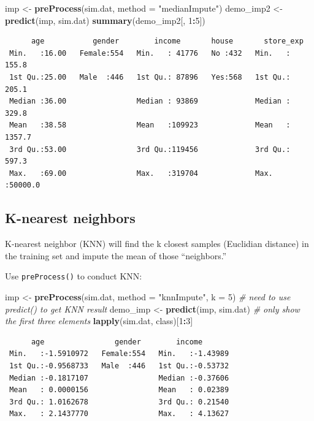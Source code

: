 \documentclass[12pt,]{krantz}
\makeatletter
\newenvironment{Shaded}{\begin{snugshade}}{\end{snugshade}}
\newcommand{\CommentTok}[1]{\textcolor[rgb]{0.37,0.37,0.37}{\textit{#1}}}
\newcommand{\DataTypeTok}[1]{\textcolor[rgb]{0.27,0.27,0.27}{#1}}
\newcommand{\DecValTok}[1]{\textcolor[rgb]{0.06,0.06,0.06}{#1}}
\newcommand{\KeywordTok}[1]{\textcolor[rgb]{0.27,0.27,0.27}{\textbf{#1}}}
\newcommand{\NormalTok}[1]{#1}
\newcommand{\OperatorTok}[1]{\textcolor[rgb]{0.43,0.43,0.43}{\textbf{#1}}}
\newcommand{\StringTok}[1]{\textcolor[rgb]{0.5,0.5,0.5}{#1}}
\newenvironment{kframe}{%
\medskip{}
\setlength{\fboxsep}{.8em}
 \def\at@end@of@kframe{}%
 \ifinner\ifhmode%
  \def\at@end@of@kframe{\end{minipage}}%
  \begin{minipage}{\columnwidth}%
 \fi\fi%
 \def\FrameCommand##1{\hskip\@totalleftmargin \hskip-\fboxsep
 \colorbox{shadecolor}{##1}\hskip-\fboxsep
     \hskip-\linewidth \hskip-\@totalleftmargin \hskip\columnwidth}%
 \MakeFramed {\advance\hsize-\width
   \@totalleftmargin\z@ \linewidth\hsize
   \@setminipage}}%
 {\par\unskip\endMakeFramed%
 \at@end@of@kframe}
\renewenvironment{Shaded}{\begin{kframe}}{\end{kframe}}
\makeatother
\begin{document}
\begin{Shaded}
\begin{Highlighting}[]
\NormalTok{imp <-}\StringTok{ }\KeywordTok{preProcess}\NormalTok{(sim.dat, }\DataTypeTok{method =} \StringTok{"medianImpute"}\NormalTok{)}
\NormalTok{demo_imp2 <-}\StringTok{ }\KeywordTok{predict}\NormalTok{(imp, sim.dat)}
\KeywordTok{summary}\NormalTok{(demo_imp2[, }\DecValTok{1}\OperatorTok{:}\DecValTok{5}\NormalTok{])}
\end{Highlighting}
\end{Shaded}

\begin{verbatim}
      age           gender        income       house       store_exp      
 Min.   :16.00   Female:554   Min.   : 41776   No :432   Min.   :  155.8  
 1st Qu.:25.00   Male  :446   1st Qu.: 87896   Yes:568   1st Qu.:  205.1  
 Median :36.00                Median : 93869             Median :  329.8  
 Mean   :38.58                Mean   :109923             Mean   : 1357.7  
 3rd Qu.:53.00                3rd Qu.:119456             3rd Qu.:  597.3  
 Max.   :69.00                Max.   :319704             Max.   :50000.0  
\end{verbatim}

\hypertarget{k-nearest-neighbors}{%
\subsection{K-nearest neighbors}\label{k-nearest-neighbors}}

K-nearest neighbor (KNN) will find the k closest samples (Euclidian distance) in the training set and impute the mean of those ``neighbors.''

Use \texttt{preProcess()} to conduct KNN:

\begin{Shaded}
\begin{Highlighting}[]
\NormalTok{imp <-}\StringTok{ }\KeywordTok{preProcess}\NormalTok{(sim.dat, }\DataTypeTok{method =} \StringTok{"knnImpute"}\NormalTok{, }\DataTypeTok{k =} \DecValTok{5}\NormalTok{)}
\CommentTok{# need to use predict() to get KNN result}
\NormalTok{demo_imp <-}\StringTok{ }\KeywordTok{predict}\NormalTok{(imp, sim.dat)}
\CommentTok{# only show the first three elements}
\KeywordTok{lapply}\NormalTok{(sim.dat, class)[}\DecValTok{1}\OperatorTok{:}\DecValTok{3}\NormalTok{]}
\end{Highlighting}
\end{Shaded}

\begin{verbatim}
      age                gender        income        
 Min.   :-1.5910972   Female:554   Min.   :-1.43989  
 1st Qu.:-0.9568733   Male  :446   1st Qu.:-0.53732  
 Median :-0.1817107                Median :-0.37606  
 Mean   : 0.0000156                Mean   : 0.02389  
 3rd Qu.: 1.0162678                3rd Qu.: 0.21540  
 Max.   : 2.1437770                Max.   : 4.13627 
\end{verbatim}
\end{document}
